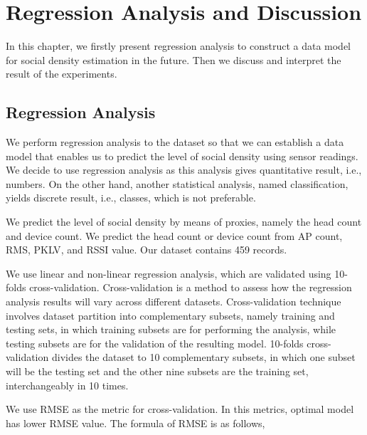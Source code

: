 \chapter{Regression Analysis and Discussion}
\label{ch:regression-and-discussion} %
In this chapter, we firstly present regression analysis to construct a data model for social density estimation in the future. Then we discuss and interpret the result of the experiments.

\section{Regression Analysis} %
\label{sec:regression_analysis}
We perform regression analysis to the dataset so that we can establish a data model that enables us to predict the level of social density using sensor readings. We decide to use regression analysis as this analysis gives quantitative result, i.e., numbers. On the other hand, another statistical analysis, named classification, yields discrete result, i.e., classes, which is not preferable.

We predict the level of social density by means of proxies, namely the head count and device count. We predict the head count or device count from \ac{AP} count, \ac{RMS}, \ac{PKLV}, and \ac{RSSI} value. Our dataset contains 459 records.

We use linear and non-linear regression analysis, which are validated using 10-folds cross-validation. Cross-validation is a method to assess how the regression analysis results will vary across different datasets. Cross-validation technique involves dataset partition into complementary subsets, namely training and testing sets, in which training subsets are for performing the analysis, while testing subsets are for the validation of the resulting model. 10-folds cross-validation divides the dataset to 10 complementary subsets, in which one subset will be the testing set and the other nine subsets are the training set, interchangeably in 10 times.

We use \ac{RMSE} as the metric for cross-validation. In this metrics, optimal model has lower \ac{RMSE} value. The formula of \ac{RMSE} is as follows,

